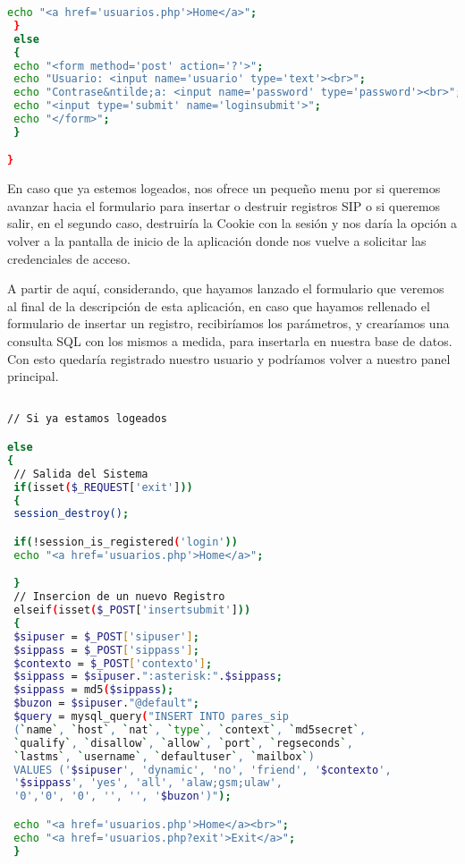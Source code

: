 {\begin{lstlisting}[language=bash,title={./www/usuarios.php}]
 echo "<a href='usuarios.php'>Home</a>";
 }
 else
 {
 echo "<form method='post' action='?'>";
 echo "Usuario: <input name='usuario' type='text'><br>";
 echo "Contrase&ntilde;a: <input name='password' type='password'><br>";
 echo "<input type='submit' name='loginsubmit'>";
 echo "</form>";
 }

}

\end{lstlisting}

En caso que ya estemos logeados, nos ofrece un pequeño menu por si queremos avanzar hacia el formulario para insertar o destruir registros SIP o si queremos salir, en el segundo caso, destruiría la Cookie con la sesión y nos daría la opción a volver a la pantalla de inicio de la aplicación donde nos vuelve a solicitar las credenciales de acceso.

A partir de aquí, considerando, que hayamos lanzado el formulario que veremos al final de la descripción de esta aplicación, en caso que hayamos rellenado el formulario de insertar un registro, recibiríamos los parámetros, y crearíamos una consulta SQL con los mismos a medida, para insertarla en nuestra base de datos. Con esto quedaría registrado nuestro usuario y podríamos volver a nuestro panel principal.

\begin{lstlisting}[language=bash,title={./www/usuarios.php}]

// Si ya estamos logeados

else
{
 // Salida del Sistema
 if(isset($_REQUEST['exit']))
 {
 session_destroy();

 if(!session_is_registered('login'))
 echo "<a href='usuarios.php'>Home</a>";

 }
 // Insercion de un nuevo Registro
 elseif(isset($_POST['insertsubmit']))
 {
 $sipuser = $_POST['sipuser'];
 $sippass = $_POST['sippass'];
 $contexto = $_POST['contexto'];
 $sippass = $sipuser.":asterisk:".$sippass;
 $sippass = md5($sippass);
 $buzon = $sipuser."@default";
 $query = mysql_query("INSERT INTO pares_sip 
 (`name`, `host`, `nat`, `type`, `context`, `md5secret`, 
 `qualify`, `disallow`, `allow`, `port`, `regseconds`, 
 `lastms`, `username`, `defaultuser`, `mailbox`)
 VALUES ('$sipuser', 'dynamic', 'no', 'friend', '$contexto', 
 '$sippass', 'yes', 'all', 'alaw;gsm;ulaw',
 '0','0', '0', '', '', '$buzon')");

 echo "<a href='usuarios.php'>Home</a><br>";
 echo "<a href='usuarios.php?exit'>Exit</a>";
 }

\end{lstlisting}

}
